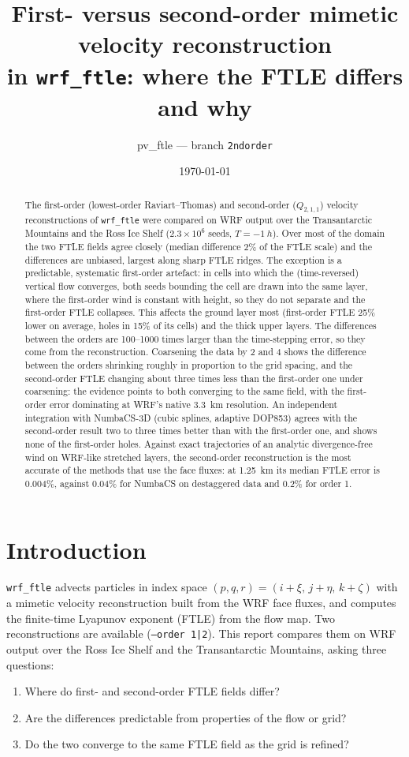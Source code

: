 \documentclass[11pt,a4paper]{article}
\title{First- versus second-order mimetic velocity reconstruction\\
       in \texttt{wrf\_ftle}: where the FTLE differs and why}
\author{pv\_ftle --- branch \texttt{2ndorder}}
\date{\today}
\begin{document}
\maketitle

\begin{abstract}
The first-order (lowest-order Raviart--Thomas) and second-order ($Q_{2,1,1}$)
velocity reconstructions of \texttt{wrf\_ftle} were compared on WRF output over
the Transantarctic Mountains and the Ross Ice Shelf ($2.3\times10^6$ seeds,
$T=\SI{-1}{h}$). Over most of the domain the two FTLE fields agree closely
(median difference 2\% of the FTLE scale) and the differences are unbiased,
largest along sharp FTLE ridges. The exception is a predictable, systematic
first-order artefact: in cells into which the (time-reversed) vertical flow
converges, both seeds bounding the cell are drawn into the same layer, where
the first-order wind is constant with height, so they do not separate and the
first-order FTLE collapses. This affects the ground layer most (first-order FTLE
25\% lower on average, holes in 15\% of its cells) and the thick upper layers.
The differences between the orders are 100--1000 times larger than the
time-stepping error, so they come from the reconstruction. Coarsening the data
by 2 and 4 shows the difference between the orders shrinking roughly in
proportion to the grid spacing, and the second-order FTLE changing about three
times less than the first-order one under coarsening: the evidence points to
both converging to the same field, with the first-order error dominating at
WRF's native \SI{3.3}{km} resolution. An independent integration with
NumbaCS-3D (cubic splines, adaptive DOP853) agrees with the second-order
result two to three times better than with the first-order one, and shows
none of the first-order holes. Against exact trajectories of an analytic
divergence-free wind on WRF-like stretched layers, the second-order
reconstruction is the most accurate of the methods that use the face fluxes:
at \SI{1.25}{km} its median FTLE error is 0.004\%, against 0.04\% for NumbaCS on
destaggered data and 0.2\% for order 1.
\end{abstract}

\section{Introduction}

\texttt{wrf\_ftle} advects particles in index space $(p,q,r)=(i+\xi,\,j+\eta,\,k+\zeta)$
with a mimetic velocity reconstruction built from the WRF face fluxes, and
computes the finite-time Lyapunov exponent (FTLE) from the flow map.
Two reconstructions are available (\texttt{--order 1|2}).
This report compares them on WRF output over the Ross Ice Shelf and the
Transantarctic Mountains, asking three questions:
\begin{enumerate}
  \item Where do first- and second-order FTLE fields differ?
  \item Are the differences predictable from properties of the flow or grid?
  \item Do the two converge to the same FTLE field as the grid is refined?
\end{enumerate}
\end{document}

